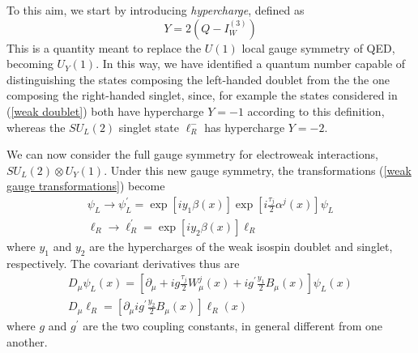 \documentclass[10pt,a4paper]{book}
\begin{document}
To this aim, we start by introducing \emph{hypercharge}, defined as
\begin{equation}
\label{def hypercharge}
Y = 2(Q-I^{(3)}_W)
\end{equation} 
This is a quantity meant to replace the $U(1)$ local gauge symmetry of QED, becoming $U_Y(1)$. In this way, we have identified a quantum number capable of distinguishing the states composing the left-handed doublet from the the one composing the right-handed singlet, since, for example the states considered in (\ref{weak doublet}) both have hypercharge $Y=-1$ according to this definition, whereas the $SU_L(2)$ singlet state $\ell^-_R$ has hypercharge $Y=-2$. 

We can now consider the full gauge symmetry for electroweak interactions, $SU_L(2) \otimes U_Y(1)$. Under this new gauge symmetry, the transformations (\ref{weak gauge transformations}) become
\begin{gather}
\label{electroweak gauge transformations}
\psi_L \rightarrow \psi_L^\prime = \exp\left[iy_1\beta(x)\right]\exp\left[i\frac{\tau_j}{2} \alpha^j (x)\right]\psi_L \\
\ell_R \rightarrow \ell_R^\prime = \exp\left[iy_2\beta(x)\right]\ell_R
\end{gather}
where $y_1$ and $y_2$ are the hypercharges of the weak isospin doublet and singlet, respectively. The covariant derivatives thus are
\begin{gather}
\label{EW covariant}
D_\mu \psi_L(x) = \left[\partial_\mu + ig\frac{\tau_j}{2}W^j_\mu(x) + ig^\prime \frac{y_1}{2} B_\mu(x) \right]\psi_L(x) \\
D_\mu \ell_R = \left[\partial_\mu ig^\prime \frac{y_2}{2} B_\mu(x)\right]\ell_R(x)
\end{gather}
where $g$ and $g^\prime$ are the two coupling constants, in general different from one another.
\end{document}
